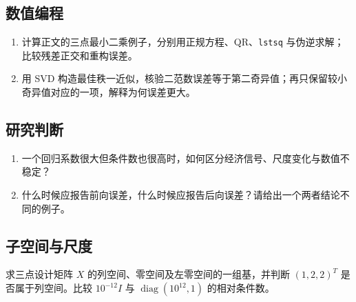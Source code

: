 \subsection*{数值编程}
\begin{enumerate}[nosep,leftmargin=*]
  \item 计算正文的三点最小二乘例子，分别用正规方程、QR、\texttt{lstsq} 与伪逆求解；比较残差正交和重构误差。
  \item 用 SVD 构造最佳秩一近似，核验二范数误差等于第二奇异值；再只保留较小奇异值对应的一项，解释为何误差更大。
\end{enumerate}

\subsection*{研究判断}
\begin{enumerate}[nosep,leftmargin=*]
  \item 一个回归系数很大但条件数也很高时，如何区分经济信号、尺度变化与数值不稳定？
  \item 什么时候应报告前向误差，什么时候应报告后向误差？请给出一个两者结论不同的例子。
\end{enumerate}

\endgroup


\MFQMappedUpperChSixQuestions

\subsection*{子空间与尺度}
求三点设计矩阵 $X$ 的列空间、零空间及左零空间的一组基，并判断 $(1,2,2)^T$ 是否属于列空间。比较 $10^{-12}I$ 与 $\operatorname{diag}(10^{12},1)$ 的相对条件数。
